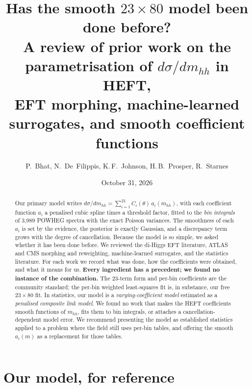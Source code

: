 
\usepackage{array,tabularx}
\newcommand{\bbeta}{\boldsymbol{\beta}}
\newcommand{\bC}{\boldsymbol{C}}

\title{\textbf{Has the smooth $23\times80$ model been done before?}\\[4pt]
\large A review of prior work on the parametrisation of $d\sigma/dm_{hh}$ in HEFT,\\
EFT morphing, machine-learned surrogates, and smooth coefficient functions}
\author{P.~Bhat, N.~De~Filippis, K.\,F.~Johnson, H.\,B.~Prosper, R.~Starnes}
\date{October 31, 2026}


\maketitle

\begin{abstract}
\noindent
Our primary model writes $d\sigma/dm_{hh} = \sum_{i=1}^{23} C_i(\theta)\,a_i(m_{hh})$, with
each coefficient function $a_i$ a penalised cubic spline times a threshold factor, fitted to
the \emph{bin integrals} of 3,989 POWHEG spectra with the exact Poisson variances. The
smoothness of each $a_i$ is set by the evidence, the posterior is exactly Gaussian, and a
discrepancy term grows with the degree of cancellation. Because the model is so simple, we
asked whether it has been done before. We reviewed the di-Higgs EFT literature, ATLAS and
CMS morphing and reweighting, machine-learned surrogates, and the statistics literature. For
each work we record what was done, how the coefficients were obtained, and what it means for
us. \textbf{Every ingredient has a precedent; we found no instance of the combination.} The
23-term form and per-bin coefficients are the community standard; the per-bin weighted
least-squares fit is, in substance, our free $23\times80$ fit. In statistics, our model is a
\emph{varying-coefficient model} estimated as a \emph{penalised composite link model}. We
found no work that makes the HEFT coefficients smooth functions of $m_{hh}$, fits them to bin
integrals, or attaches a cancellation-dependent model error. We recommend presenting the
model as established statistics applied to a problem where the field still uses per-bin
tables, and offering the smooth $a_i(m)$ as a replacement for those tables.
\end{abstract}

\tableofcontents

\section{Our model, for reference}
\label{sec:ours}

